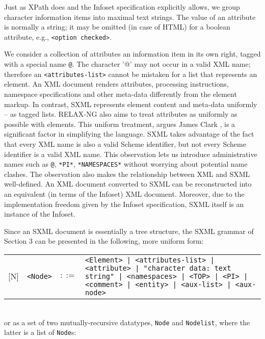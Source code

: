\documentclass[10pt]{article}
\begin{document}
Just as XPath does and the Infoset specification explicitly allows,
we group character information items into maximal text strings.  The
value of an attribute is normally a string; it may be omitted (in
case of HTML) for a boolean attribute, e.g., \texttt{<option checked>}.

We consider a collection of attributes an information item in its
own right, tagged with a special name \texttt{@}. The character '@'
may not occur in a valid XML name; therefore
an \texttt{<attributes-list>} cannot be mistaken for a list that represents an element. An XML
document renders attributes, processing instructions, namespace
specifications and other meta-data differently from the element
markup. In contrast, SXML represents element content and meta-data
uniformly -- as tagged lists. RELAX-NG also aims to treat attributes
as uniformly as possible with elements. This uniform treatment, argues James
Clark \cite{RNG-Design}, is a significant factor
in simplifying the language.  SXML takes advantage of the fact that
every XML name is also a valid Scheme identifier, but not every
Scheme identifier is a valid XML name. This observation lets us
introduce administrative names such as \texttt{@}, \texttt{*PI*}, \texttt{*NAMESPACES*} without worrying about potential name
clashes. The observation also makes the relationship between XML and SXML
well-defined. An XML document converted to SXML can be reconstructed
into an equivalent (in terms of the Infoset) XML document. Moreover, due
to the implementation freedom given by the Infoset specification, SXML
itself is an instance of the Infoset.

Since an SXML document is essentially a tree structure, the SXML grammar of Section 3 can be presented in the following, more uniform form:

\begin{tabular}{rrcp{2.8in}}
{[}N{]} & \texttt{<Node>} &  $::=$ & \texttt{<Element> | <attributes-list> | <attribute> | "character data: text string" | <namespaces> | <TOP> | <PI> | <comment> | <entity> | <aux-list> | <aux-node> } \\
\end{tabular}
\\
or as a set of two mutually-recursive datatypes, 
\texttt{Node} and \texttt{Nodelist}, where the latter is a list of \texttt{Node}s: 
\end{document}
